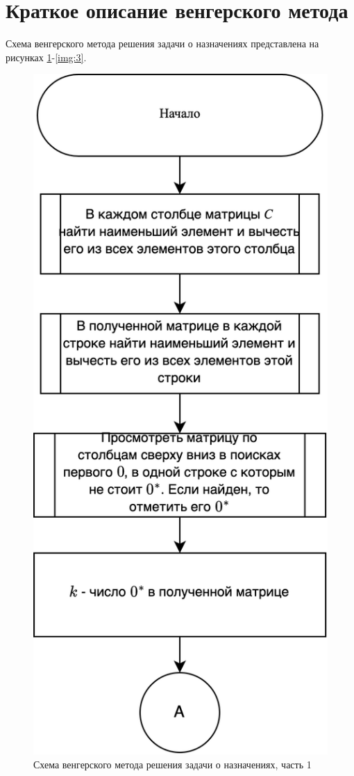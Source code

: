\documentclass{bmstu}
\begin{document}
\section{Краткое описание венгерского метода}

Схема венгерского метода решения задачи о назначениях представлена на рисунках \ref{img:1}-\ref{img:3}.

\begin{figure}[h!]
	\begin{center}
		\includegraphics[scale=0.2]{inc/img/1.png}
	\end{center}
	\caption{Схема венгерского метода решения задачи о назначениях, часть 1}
	\label{img:1}
\end{figure}
\end{document}
